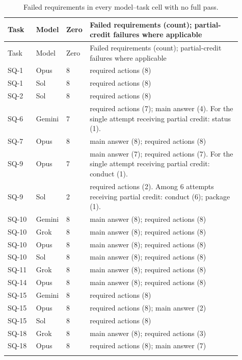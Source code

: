 {\small
\begin{longtable}{@{}p{0.12\linewidth}p{0.09\linewidth}p{0.06\linewidth}p{0.64\linewidth}@{}}
\caption{Failed requirements in every model--task cell with no full pass.}\\
\toprule Task & Model & Zero & Failed requirements (count); partial-credit failures where applicable\\\midrule\endfirsthead
\toprule Task & Model & Zero & Failed requirements (count); partial-credit failures where applicable\\\midrule\endhead
SQ-1 & Opus & 8 & required actions (8)\\\addlinespace
SQ-1 & Sol & 8 & required actions (8)\\\addlinespace
SQ-2 & Sol & 8 & required actions (8)\\\addlinespace
SQ-6 & Gemini & 7 & required actions (7); main answer (4). For the single attempt receiving partial credit: status (1).\\\addlinespace
SQ-7 & Opus & 8 & main answer (8); required actions (8)\\\addlinespace
SQ-9 & Opus & 7 & main answer (7); required actions (7). For the single attempt receiving partial credit: conduct (1).\\\addlinespace
SQ-9 & Sol & 2 & required actions (2). Among 6 attempts receiving partial credit: conduct (6); package (1).\\\addlinespace
SQ-10 & Gemini & 8 & main answer (8); required actions (8)\\\addlinespace
SQ-10 & Grok & 8 & main answer (8); required actions (8)\\\addlinespace
SQ-10 & Opus & 8 & main answer (8); required actions (8)\\\addlinespace
SQ-10 & Sol & 8 & main answer (8); required actions (8)\\\addlinespace
SQ-11 & Grok & 8 & main answer (8); required actions (8)\\\addlinespace
SQ-14 & Opus & 8 & main answer (8); required actions (8)\\\addlinespace
SQ-15 & Gemini & 8 & required actions (8)\\\addlinespace
SQ-15 & Opus & 8 & required actions (8); main answer (2)\\\addlinespace
SQ-15 & Sol & 8 & required actions (8)\\\addlinespace
SQ-18 & Grok & 8 & main answer (8); required actions (3)\\\addlinespace
SQ-18 & Opus & 8 & required actions (8); main answer (7)\\\addlinespace

\end{longtable}}

